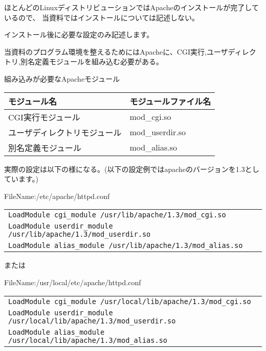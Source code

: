 ほとんどのLinuxディストリビューションではApacheのインストールが完了しているので、
当資料ではインストールについては記述しない。

インストール後に必要な設定のみ記述します。

当資料のプログラム環境を整えるためにはApacheに、CGI実行,ユーザディレクトリ,別名定義モジュールを組み込む必要がある。

\vspace{1em}
{\gt 組み込みが必要なApacheモジュール}

\begin{tabular}{|l|l|}
\hline
モジュール名 & モジュールファイル名 \\
\hline
CGI実行モジュール		&mod\_cgi.so	\\
ユーザディレクトリモジュール	&mod\_userdir.so\\
別名定義モジュール		&mod\_alias.so	\\
\hline
\end{tabular}

実際の設定は以下の様になる。(以下の設定例ではapacheのバージョンを1.3としています。)

FileName:/etc/apache/httpd.conf

\begin{tabular}{|l|}
\hline
\verb+LoadModule cgi_module /usr/lib/apache/1.3/mod_cgi.so+\\
\verb+LoadModule userdir_module /usr/lib/apache/1.3/mod_userdir.so+\\
\verb+LoadModule alias_module /usr/lib/apache/1.3/mod_alias.so+\\
\hline
\end{tabular}

または

FileName:/usr/local/etc/apache/httpd.conf

\begin{tabular}{|l|}
\hline
\verb+LoadModule cgi_module /usr/local/lib/apache/1.3/mod_cgi.so+\\
\verb+LoadModule userdir_module /usr/local/lib/apache/1.3/mod_userdir.so+\\
\verb+LoadModule alias_module /usr/local/lib/apache/1.3/mod_alias.so+\\
\hline
\end{tabular}

%
%
%
%
%
 

